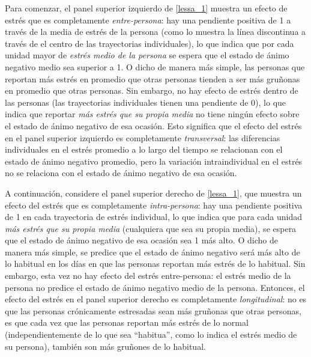 \documentclass[spanish]{article}
\numberwithin{figure}{subsection}
\numberwithin{equation}{subsection}
\numberwithin{table}{subsection}
\begin{document}
Para comenzar, el panel superior izquierdo de \ref{lessa_1} muestra un efecto
de estrés que es completamente \textit{entre-persona}: hay una pendiente
positiva de 1 a través de la media de estrés de la persona (como lo muestra la
línea discontinua a través de el centro de las trayectorias individuales), lo
que indica que por cada unidad mayor de \textit{estrés medio de la persona} se
espera que el estado de ánimo negativo medio sea superior a 1. O dicho de
manera más simple, las personas que reportan más estrés en promedio que otras
personas tienden a ser más gruñonas en promedio que otras personas. Sin
embargo, no hay efecto de estrés dentro de las personas (las trayectorias
individuales tienen una pendiente de 0), lo que indica que reportar \textit{más
estrés que su propia media} no tiene ningún efecto sobre el estado de ánimo
negativo de esa ocasión. Esto significa que el efecto del estrés en el panel
superior izquierdo es completamente \textit{transversal}: las diferencias
individuales en el estrés promedio a lo largo del tiempo se relacionan con el
estado de ánimo negativo promedio, pero la variación intraindividual en el
estrés no se relaciona con el estado de ánimo negativo de esa ocasión.

A continuación, considere el panel superior derecho de \ref{lessa_1}, que
muestra un efecto del estrés que es completamente \textit{intra-persona}: hay
una pendiente positiva de 1 en cada trayectoria de estrés individual, lo que
indica que para cada unidad \textit{más estrés que su propia media} (cualquiera
que sea su propia media), se espera que el estado de ánimo negativo de esa
ocasión sea 1 más alto. O dicho de manera más simple, se predice que el estado
de ánimo negativo será más alto de lo habitual en los días en que las personas
reportan más estrés de lo habitual. Sin embargo, esta vez no hay efecto del
estrés entre-persona: el estrés medio de la persona no predice el estado de
ánimo negativo medio de la persona. Entonces, el efecto del estrés en el panel
superior derecho es completamente \textit{longitudinal}: no es que las personas
crónicamente estresadas sean más gruñonas que otras personas, es que cada vez
que las personas reportan más estrés de lo normal (independientemente de lo que
sea ``habitua'', como lo indica el estrés medio de su persona), también son más
gruñones de lo habitual.
\end{document}
